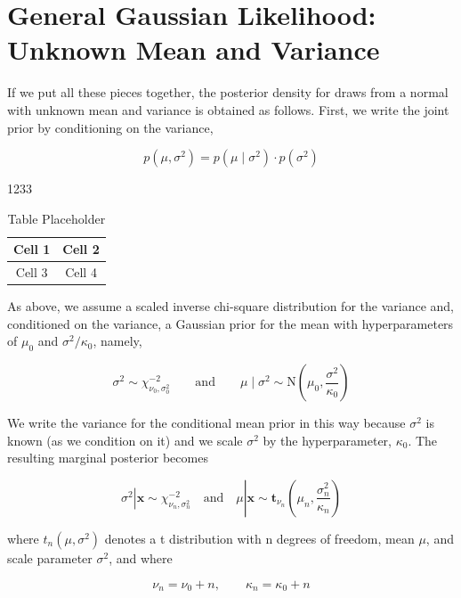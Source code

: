 \documentclass{article}
\begin{document}
\section{General Gaussian Likelihood: Unknown Mean and Variance}
If we put all these pieces together, the posterior density for draws from a normal with unknown mean and variance is obtained as follows. First, we write the joint prior by conditioning on the variance,

\begin{equation}
p(\mu,\sigma^{2})=p(\mu\mid\sigma^{2})\cdot p(\sigma^{2})
\end{equation}

1233

\begin{table}[h]
\centering
\begin{tabular}{|c|c|}
\hline
Cell 1 & Cell 2 \\
\hline
Cell 3 & Cell 4 \\
\hline
\end{tabular}
\caption{Table Placeholder}
\end{table}

As above, we assume a scaled inverse chi-square distribution for the variance and, conditioned on the variance, a Gaussian prior for the mean with hyperparameters of  $ \mu_0 $ and  $ \sigma^2/\kappa_0 $, namely,

\begin{equation}
\sigma^{2}\sim\chi_{\nu_{0},\sigma_{0}^{2}}^{-2}\qquad\mathrm{a n d}\qquad\mu\mid\sigma^{2}\sim\mathrm{N}\left(\mu_{0},\frac{\sigma^{2}}{\kappa_{0}}\right)
\end{equation}

We write the variance for the conditional mean prior in this way because  $ \sigma^{2} $ is known (as we condition on it) and we scale  $ \sigma^{2} $ by the hyperparameter,  $ \kappa_{0} $. The resulting marginal posterior becomes

\begin{equation}
\sigma^{2}\left|\textbf{x}\sim\chi_{\nu_{n},\sigma_{n}^{2}}^{-2}\right.\quad\mathrm{a n d}\quad\mu\left|\textbf{x}\sim\textbf{t}_{\nu_{n}}\left(\mu_{n},\frac{\sigma_{n}^{2}}{\kappa_{n}}\right)\right.
\end{equation}

where  $ t_{n}(\mu,\sigma^{2}) $ denotes a t distribution with n degrees of freedom, mean  $ \mu $, and scale parameter  $ \sigma^{2} $, and where

\begin{equation}
\nu_{n}=\nu_{0}+n,\qquad\kappa_{n}=\kappa_{0}+n
\end{equation}
\end{document}
